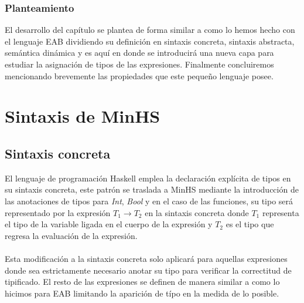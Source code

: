 \subsubsection{Planteamiento}
El desarrollo del capítulo se plantea de forma similar a como lo hemos hecho con el lenguaje \textsf{EAB} dividiendo su definición en sintaxis concreta, sintaxis abstracta, semántica dinámica y es aquí en donde se introducirá una nueva capa para estudiar la asignación de tipos de las expresiones. Finalmente concluiremos mencionando brevemente las propiedades que este pequeño lenguaje posee. \\

\section{Sintaxis de \textsf{MinHS}}

\subsection{Sintaxis concreta}
    El lenguaje de programación \textsf{Haskell} emplea la declaración explícita de tipos en su sintaxis concreta, este patrón se traslada a \textsf{MinHS} mediante la introducción de las anotaciones de tipos para \textit{Int}, \textit{Bool} y en el caso de las funciones, su tipo será representado por la expresión $T_1 \rightarrow T_2$ en la sintaxis concreta donde $T_1$ representa el tipo de la variable ligada en el cuerpo de la expresión  y $T_2$ es el tipo que regresa la evaluación de la expresión.\\\\
Esta modificación a la sintaxis concreta solo aplicará para aquellas expresiones donde sea estrictamente necesario anotar su tipo para verificar la correctitud de tipificado. El resto de las expresiones se definen de manera similar a como lo hicimos para \textsf{EAB} limitando la aparición de típo en la medida de lo posible.

